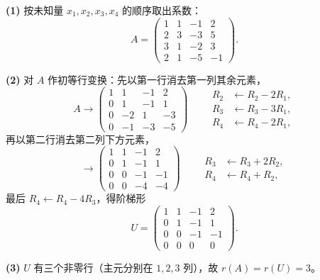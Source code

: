 \begin{solution}
\textbf{(1)} 按未知量 $x_1,x_2,x_3,x_4$ 的顺序取出系数：
\[
A=\begin{pmatrix}1&1&-1&2\\2&3&-3&5\\3&1&-2&3\\2&1&-5&-1\end{pmatrix}.
\]

\textbf{(2)} 对 $A$ 作初等行变换：先以第一行消去第一列其余元素，
\[
A\to\begin{pmatrix}1&1&-1&2\\0&1&-1&1\\0&-2&1&-3\\0&-1&-3&-5\end{pmatrix}
\qquad\begin{aligned}
R_2&\leftarrow R_2-2R_1,\\
R_3&\leftarrow R_3-3R_1,\\
R_4&\leftarrow R_4-2R_1,
\end{aligned}
\]
再以第二行消去第二列下方元素，
\[
\to\begin{pmatrix}1&1&-1&2\\0&1&-1&1\\0&0&-1&-1\\0&0&-4&-4\end{pmatrix}
\qquad\begin{aligned}
R_3&\leftarrow R_3+2R_2,\\
R_4&\leftarrow R_4+R_2,
\end{aligned}
\]
最后 $R_4\leftarrow R_4-4R_3$，得阶梯形
\[
U=\begin{pmatrix}1&1&-1&2\\0&1&-1&1\\0&0&-1&-1\\0&0&0&0\end{pmatrix}.
\]

\textbf{(3)} $U$ 有三个非零行（主元分别在 $1,2,3$ 列），故 $r(A)=r(U)=3$。


\end{solution}
